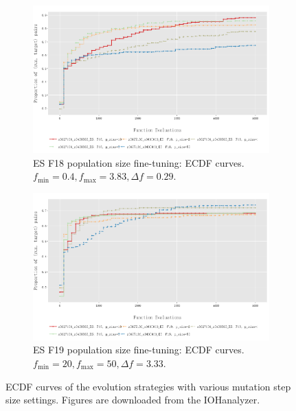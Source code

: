 \documentclass{article}
\begin{document}
\begin{figure}[!ht]
    \begin{subfigure}[h]{0.95\linewidth}
        \includegraphics[width=\linewidth]{es/f18/ECDF18ps.png}
        \caption{ES F18 population size fine-tuning: ECDF curves. $f_{\min} = 0.4, f_{\max} = 3.83, \Delta f = 0.29$.}
    \end{subfigure}
    \hfill
    \begin{subfigure}[h]{0.95\linewidth}
        \includegraphics[width=\linewidth]{es/f19/ECDF19ps.png}
        \caption{ES F19 population size fine-tuning: ECDF curves. $f_{\min} = 20, f_{\max} = 50, \Delta f = 3.33$.}
    \end{subfigure}
    \caption{ECDF curves of the evolution strategies with various mutation step size settings. Figures are downloaded from the IOHanalyzer.}
    \label{fig:experi-es-psize-ecdf}
\end{figure}
\end{document}
